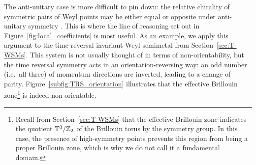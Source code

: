 The anti-unitary case is more difficult to pin down: the relative chirality of symmetric pairs of Weyl points may be either equal or opposite under anti-unitary symmetry \cite{Abdulla_chiral-WSM}. This is where the line of reasoning set out in Figure~\ref{fig:local_coefficients} is most useful. As an example, we apply this argument to the time-reversal invariant Weyl semimetal from Section~\ref{sec:T-WSMs}. This system is not usually thought of in terms of non-orientability, but the time reversal symmetry acts in an orientation-reversing way: an odd number (i.e.\ all three) of momentum directions are inverted, leading to a change of parity. Figure~\ref{subfig:TRS_orientation} illustrates that the effective Brillouin zone\footnote{
	Recall from Section~\ref{sec:T-WSMs} that the effective Brillouin zone indicates the quotient $\mathbb{T}^3 / \mathbb{Z}_2$ of the Brillouin torus by the symmetry group. In this case, the presence of high-symmetry points prevents this region from being a proper Brillouin zone, which is why we do not call it a fundamental domain.}
is indeed non-orientable.
